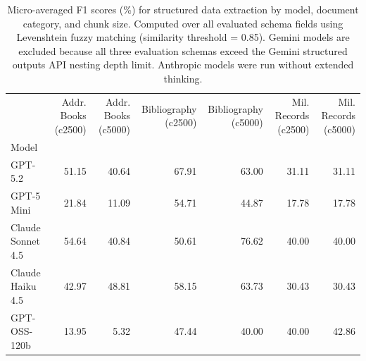 \begin{table}
\caption{Micro-averaged F1 scores (\%) for structured data extraction by model, document category, and chunk size. Computed over all evaluated schema fields using Levenshtein fuzzy matching (similarity threshold = 0.85). Gemini models are excluded because all three evaluation schemas exceed the Gemini structured outputs API nesting depth limit. Anthropic models were run without extended thinking.}
\label{tab:extraction_f1}
\begin{tabular}{lrrrrrr}
\toprule
 & Addr. Books (c2500) & Addr. Books (c5000) & Bibliography (c2500) & Bibliography (c5000) & Mil. Records (c2500) & Mil. Records (c5000) \\
Model &  &  &  &  &  &  \\
\midrule
GPT-5.2 & 51.15 & 40.64 & 67.91 & 63.00 & 31.11 & 31.11 \\
GPT-5 Mini & 21.84 & 11.09 & 54.71 & 44.87 & 17.78 & 17.78 \\
Claude Sonnet 4.5 & 54.64 & 40.84 & 50.61 & 76.62 & 40.00 & 40.00 \\
Claude Haiku 4.5 & 42.97 & 48.81 & 58.15 & 63.73 & 30.43 & 30.43 \\
GPT-OSS-120b & 13.95 & 5.32 & 47.44 & 40.00 & 40.00 & 42.86 \\
\bottomrule
\end{tabular}
\end{table}
